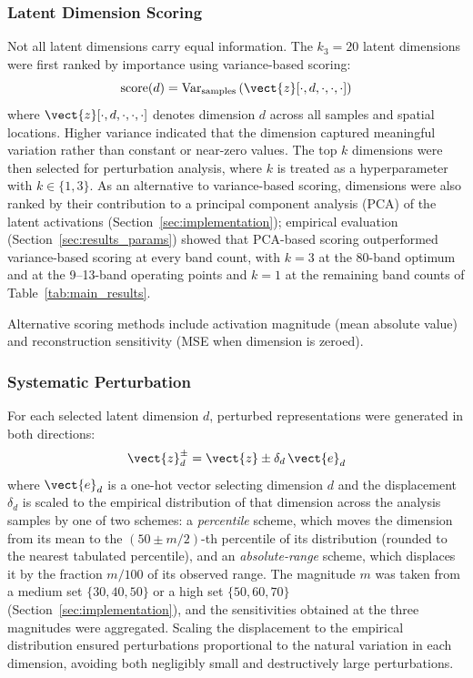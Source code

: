 \subsubsection{Latent Dimension Scoring}
Not all latent dimensions carry equal information.
The $k_3 = 20$ latent dimensions were first ranked by importance using variance-based scoring:
\begin{equation}
\text{score}(d) = \text{Var}_{\text{samples}}\left(\vect{z}[\cdot, d, \cdot, \cdot, \cdot]\right)
\label{eq:dim_score}
\end{equation}
where $\vect{z}[\cdot, d, \cdot, \cdot, \cdot]$ denotes dimension $d$ across all samples and spatial locations.
Higher variance indicated that the dimension captured meaningful variation rather than constant or near-zero values.
The top $k$ dimensions were then selected for perturbation analysis, where $k$ is treated as a hyperparameter with $k \in \{1, 3\}$.
As an alternative to variance-based scoring, dimensions were also ranked by their contribution to a principal component analysis (PCA) of the latent activations (Section~\ref{sec:implementation}); empirical evaluation (Section~\ref{sec:results_params}) showed that PCA-based scoring outperformed variance-based scoring at every band count, with $k = 3$ at the 80-band optimum and at the 9--13-band operating points and $k = 1$ at the remaining band counts of Table~\ref{tab:main_results}.

Alternative scoring methods include activation magnitude (mean absolute value) and reconstruction sensitivity (MSE when dimension is zeroed).

\subsubsection{Systematic Perturbation}
For each selected latent dimension $d$, perturbed representations were generated in both directions:
\begin{equation}
\vect{z}^{\pm}_d = \vect{z} \pm \delta_d \, \vect{e}_d
\label{eq:perturb}
\end{equation}
where $\vect{e}_d$ is a one-hot vector selecting dimension $d$ and the displacement $\delta_d$ is scaled to the empirical distribution of that dimension across the analysis samples by one of two schemes: a \emph{percentile} scheme, which moves the dimension from its mean to the $(50 \pm m/2)$-th percentile of its distribution (rounded to the nearest tabulated percentile), and an \emph{absolute-range} scheme, which displaces it by the fraction $m/100$ of its observed range.
The magnitude $m$ was taken from a medium set $\{30, 40, 50\}$ or a high set $\{50, 60, 70\}$ (Section~\ref{sec:implementation}), and the sensitivities obtained at the three magnitudes were aggregated.
Scaling the displacement to the empirical distribution ensured perturbations proportional to the natural variation in each dimension, avoiding both negligibly small and destructively large perturbations.


